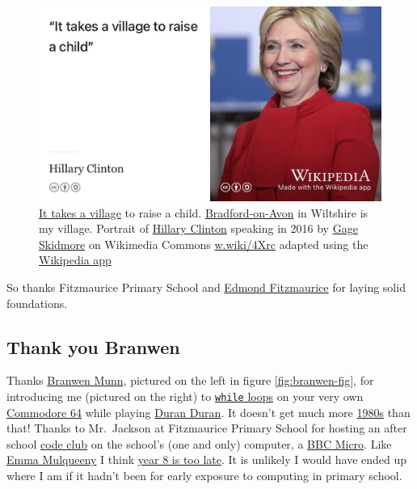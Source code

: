 \documentclass[
]{book}
\begin{document}
\begin{figure}

{\centering \includegraphics[width=1\linewidth]{images/hillary-clinton} 

}

\caption{\href{https://en.wikipedia.org/wiki/It_takes_a_village}{It takes a village} to raise a child. \citep{clinton} \href{https://en.wikipedia.org/wiki/Bradford-on-Avon}{Bradford-on-Avon} in Wiltshire is my village. Portrait of \href{https://en.wikipedia.org/wiki/Hillary_Clinton}{Hillary Clinton} speaking in 2016 by \href{https://en.wikipedia.org/wiki/Gage_Skidmore}{Gage Skidmore} on Wikimedia Commons \href{https://w.wiki/4Xrc}{w.wiki/4Xrc} adapted using the \href{https://apps.apple.com/us/app/wikipedia/id324715238}{Wikipedia app}}\label{fig:clinton-fig}
\end{figure}



So thanks Fitzmaurice Primary School and \href{https://en.wikipedia.org/wiki/Edmond_Fitzmaurice,_1st_Baron_Fitzmaurice}{Edmond Fitzmaurice} for laying solid foundations. 🙏

\hypertarget{branwen}{%
\subsection{Thank you Branwen}\label{branwen}}

Thanks \href{https://www.branwen.online/}{Branwen Munn}, pictured on the left in figure \ref{fig:branwen-fig}, for introducing me (pictured on the right) to \href{https://en.wikipedia.org/wiki/While_loop}{\texttt{while} loops} on your very own \href{https://en.wikipedia.org/wiki/Commodore_64}{Commodore 64} while playing \href{https://en.wikipedia.org/wiki/Duran_Duran}{Duran Duran}. It doesn't get much more \href{https://en.wikipedia.org/wiki/1980s}{1980s} than that! Thanks to Mr.~Jackson at Fitzmaurice Primary School for hosting an after school \href{https://codeclub.org/}{code club} on the school's (one and only) computer, a \href{https://en.wikipedia.org/wiki/BBC_Micro}{BBC Micro}. Like \href{https://en.wikipedia.org/wiki/Emma_Mulqueeny}{Emma Mulqueeny} I think \href{https://mulqueeny.wordpress.com/2011/08/10/year-8-is-too-late/}{year 8 is too late}. \citep{year8toolate} It is unlikely I would have ended up where I am if it hadn't been for early exposure to computing in primary school. \citep{computersgb}
\end{document}
